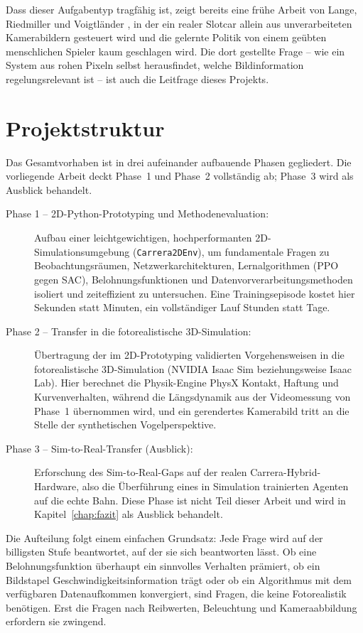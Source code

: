 Dass dieser Aufgabentyp tragfähig ist, zeigt bereits eine frühe Arbeit von Lange, Riedmiller und Voigtländer \cite{lange2012autonomous}, in der ein realer Slotcar allein aus unverarbeiteten Kamerabildern gesteuert wird und die gelernte Politik von einem geübten menschlichen Spieler kaum geschlagen wird. Die dort gestellte Frage -- wie ein System aus rohen Pixeln selbst herausfindet, welche Bildinformation regelungsrelevant ist -- ist auch die Leitfrage dieses Projekts.

\section{Projektstruktur}
\label{sec:projektstruktur}

Das Gesamtvorhaben ist in drei aufeinander aufbauende Phasen gegliedert. Die vorliegende Arbeit deckt Phase~1 und Phase~2 vollständig ab; Phase~3 wird als Ausblick behandelt.

\begin{description}
  \item[Phase 1 -- 2D-Python-Prototyping und Methodenevaluation:] Aufbau einer leichtgewichtigen, hochperformanten 2D-Simulationsumgebung (\texttt{Carrera2DEnv}), um fundamentale Fragen zu Beobachtungsräumen, Netzwerkarchitekturen, Lernalgorithmen (\ac{PPO} gegen \ac{SAC}), Belohnungsfunktionen und Datenvorverarbeitungsmethoden isoliert und zeiteffizient zu untersuchen. Eine Trainingsepisode kostet hier Sekunden statt Minuten, ein vollständiger Lauf Stunden statt Tage.
  \item[Phase 2 -- Transfer in die fotorealistische 3D-Simulation:] Übertragung der im 2D-Prototyping validierten Vorgehensweisen in die fotorealistische 3D-Simulation (NVIDIA Isaac Sim beziehungsweise Isaac Lab). Hier berechnet die Physik-Engine PhysX Kontakt, Haftung und Kurvenverhalten, während die Längsdynamik aus der Videomessung von Phase~1 übernommen wird, und ein gerendertes Kamerabild tritt an die Stelle der synthetischen Vogelperspektive.
  \item[Phase 3 -- Sim-to-Real-Transfer (Ausblick):] Erforschung des Sim-to-Real-Gaps auf der realen Carrera-Hybrid-Hardware, also die Überführung eines in Simulation trainierten Agenten auf die echte Bahn. Diese Phase ist nicht Teil dieser Arbeit und wird in Kapitel~\ref{chap:fazit} als Ausblick behandelt.
\end{description}

Die Aufteilung folgt einem einfachen Grundsatz: Jede Frage wird auf der billigsten Stufe beantwortet, auf der sie sich beantworten lässt. Ob eine Belohnungsfunktion überhaupt ein sinnvolles Verhalten prämiert, ob ein Bildstapel Geschwindigkeitsinformation trägt oder ob ein Algorithmus mit dem verfügbaren Datenaufkommen konvergiert, sind Fragen, die keine Fotorealistik benötigen. Erst die Fragen nach Reibwerten, Beleuchtung und Kameraabbildung erfordern sie zwingend.

